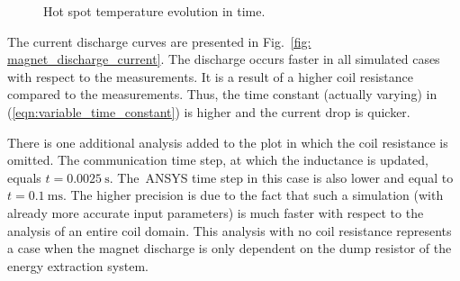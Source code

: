 \begin{figure}[H]
    \centering
    \caption{Hot spot temperature evolution in time.}
    \label{fig: magnet_discharge_hot_spot}
\end{figure}

The current discharge curves are presented in Fig.~\ref{fig: magnet_discharge_current}. The discharge occurs faster in all simulated cases with respect to the measurements. It is a result of a higher coil resistance compared to the measurements. Thus, the time constant (actually varying) in (\ref{eqn:variable_time_constant}) is higher and the current drop is quicker. 

There is one additional analysis added to the plot in which the coil resistance is omitted. The communication time step, at which the inductance is updated, equals $t=0.0025~\text{s}$. The~ANSYS time step in this case is also lower and equal to $t=0.1~\text{ms}$. The higher precision is due to the fact that such a simulation (with already more accurate input parameters) is much faster with respect to the analysis of an entire coil domain. This analysis with no coil resistance represents a case when the magnet discharge is only dependent on the dump resistor of the energy extraction system.

